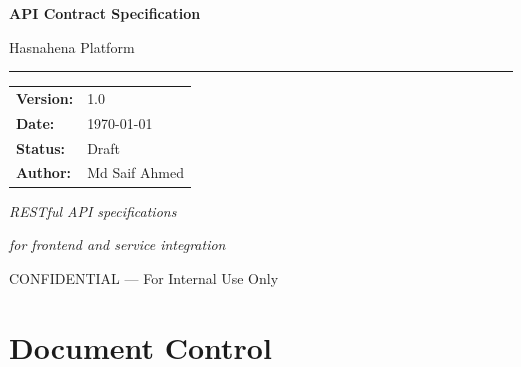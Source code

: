 \documentclass[11pt,a4paper]{article}
\newcommand{\DocumentTitle}{API Contract Specification}
\newcommand{\DocumentSubtitle}{Hasnahena Platform}
\newcommand{\DocumentVersion}{1.0}
\newcommand{\DocumentDate}{\today}
\begin{document}
\begin{titlepage}
    \centering
    \vspace*{2cm}
    
    {\Huge\bfseries\color{primaryblue}\DocumentTitle\par}
    \vspace{0.5cm}
    {\LARGE\color{darkgray}\DocumentSubtitle\par}
    
    \vspace{1.5cm}
    
    {\color{primaryblue}\rule{10cm}{2pt}\par}
    
    \vspace{2cm}
    
    \begin{tabular}{ll}
        \textbf{Version:} & \DocumentVersion \\[0.5em]
        \textbf{Date:} & \DocumentDate \\[0.5em]
        \textbf{Status:} & Draft \\[0.5em]
        \textbf{Author:} & Md Saif Ahmed \\[0.5em]
    \end{tabular}
    
    \vfill
    
    {\large\color{darkgray}\textit{RESTful API specifications}\par}
    {\large\color{darkgray}\textit{for frontend and service integration}\par}
    
    \vspace{1cm}
    
    {\footnotesize\color{darkgray}CONFIDENTIAL --- For Internal Use Only\par}
\end{titlepage}

\tableofcontents
\newpage

\section*{Document Control}
\end{document}
